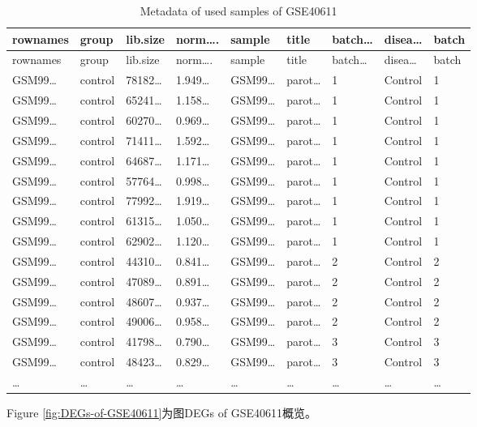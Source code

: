 \documentclass[
]{article}
\begin{document}
\begin{longtable}[]{@{}lllllllll@{}}
\caption{\label{tab:metadata-of-used-samples-of-GSE40611}Metadata of used samples of GSE40611}\tabularnewline
\toprule
rownames & group & lib.size & norm\ldots. & sample & title & batch\ldots{} & disea\ldots{} & batch\tabularnewline
\midrule
\endfirsthead
\toprule
rownames & group & lib.size & norm\ldots. & sample & title & batch\ldots{} & disea\ldots{} & batch\tabularnewline
\midrule
\endhead
GSM99\ldots{} & control & 78182\ldots{} & 1.949\ldots{} & GSM99\ldots{} & parot\ldots{} & 1 & Control & 1\tabularnewline
GSM99\ldots{} & control & 65241\ldots{} & 1.158\ldots{} & GSM99\ldots{} & parot\ldots{} & 1 & Control & 1\tabularnewline
GSM99\ldots{} & control & 60270\ldots{} & 0.969\ldots{} & GSM99\ldots{} & parot\ldots{} & 1 & Control & 1\tabularnewline
GSM99\ldots{} & control & 71411\ldots{} & 1.592\ldots{} & GSM99\ldots{} & parot\ldots{} & 1 & Control & 1\tabularnewline
GSM99\ldots{} & control & 64687\ldots{} & 1.171\ldots{} & GSM99\ldots{} & parot\ldots{} & 1 & Control & 1\tabularnewline
GSM99\ldots{} & control & 57764\ldots{} & 0.998\ldots{} & GSM99\ldots{} & parot\ldots{} & 1 & Control & 1\tabularnewline
GSM99\ldots{} & control & 77992\ldots{} & 1.919\ldots{} & GSM99\ldots{} & parot\ldots{} & 1 & Control & 1\tabularnewline
GSM99\ldots{} & control & 61315\ldots{} & 1.050\ldots{} & GSM99\ldots{} & parot\ldots{} & 1 & Control & 1\tabularnewline
GSM99\ldots{} & control & 62902\ldots{} & 1.120\ldots{} & GSM99\ldots{} & parot\ldots{} & 1 & Control & 1\tabularnewline
GSM99\ldots{} & control & 44310\ldots{} & 0.841\ldots{} & GSM99\ldots{} & parot\ldots{} & 2 & Control & 2\tabularnewline
GSM99\ldots{} & control & 47089\ldots{} & 0.891\ldots{} & GSM99\ldots{} & parot\ldots{} & 2 & Control & 2\tabularnewline
GSM99\ldots{} & control & 48607\ldots{} & 0.937\ldots{} & GSM99\ldots{} & parot\ldots{} & 2 & Control & 2\tabularnewline
GSM99\ldots{} & control & 49006\ldots{} & 0.958\ldots{} & GSM99\ldots{} & parot\ldots{} & 2 & Control & 2\tabularnewline
GSM99\ldots{} & control & 41798\ldots{} & 0.790\ldots{} & GSM99\ldots{} & parot\ldots{} & 3 & Control & 3\tabularnewline
GSM99\ldots{} & control & 48423\ldots{} & 0.829\ldots{} & GSM99\ldots{} & parot\ldots{} & 3 & Control & 3\tabularnewline
\ldots{} & \ldots{} & \ldots{} & \ldots{} & \ldots{} & \ldots{} & \ldots{} & \ldots{} & \ldots{}\tabularnewline
\bottomrule
\end{longtable}

Figure \ref{fig:DEGs-of-GSE40611}为图DEGs of GSE40611概览。
\end{document}
